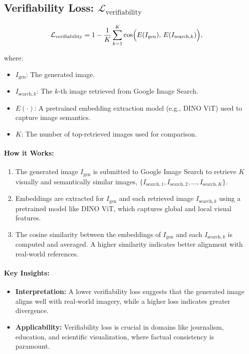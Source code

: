 \subsection{Verifiability Loss: \(\mathcal{L}_{\text{verifiability}}\)}


\[
\mathcal{L}_{\text{verifiability}}
=
1
-
\frac{1}{K}
\sum_{k=1}^{K}
\cos\Bigl(
E(I_{\text{gen}}),\,
E(I_{\text{search},k})
\Bigr),
\]

where:
\begin{itemize}
    \item \(I_{\text{gen}}\): The generated image.
    \item \(I_{\text{search},k}\): The \(k\)-th image retrieved from Google Image Search.
    \item \(E(\cdot)\): A pretrained embedding extraction model (e.g., DINO ViT) used to capture image semantics.
    \item \(K\): The number of top-retrieved images used for comparison.
\end{itemize}

\paragraph{How it Works:}
\begin{enumerate}
    \item The generated image \(I_{\text{gen}}\) is submitted to Google Image Search to retrieve \(K\) visually and semantically similar images, \(\{I_{\text{search},1}, I_{\text{search},2}, \dots, I_{\text{search},K}\}\).
    \item Embeddings are extracted for \(I_{\text{gen}}\) and each retrieved image \(I_{\text{search},k}\) using a pretrained model like DINO ViT, which captures global and local visual features.
    \item The cosine similarity between the embeddings of \(I_{\text{gen}}\) and each \(I_{\text{search},k}\) is computed and averaged. A higher similarity indicates better alignment with real-world references.
\end{enumerate}

\paragraph{Key Insights:}
\begin{itemize}
    \item \textbf{Interpretation:} A lower verifiability loss suggests that the generated image aligns well with real-world imagery, while a higher loss indicates greater divergence.
    \item \textbf{Applicability:} Verifiability loss is crucial in domains like journalism, education, and scientific visualization, where factual consistency is paramount.
\end{itemize}

